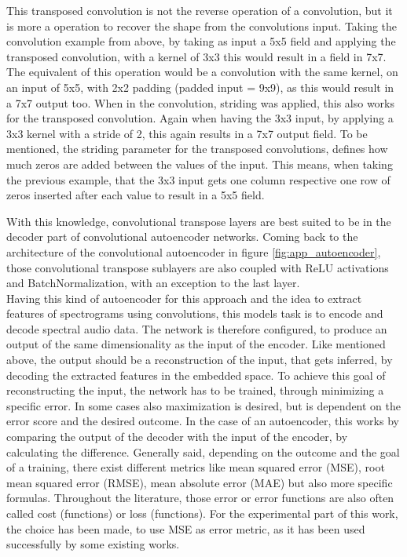 This transposed convolution is not the reverse operation of a convolution, but it is more a operation to recover the shape from the convolutions input. \cite{dumoulin2018guideconv} Taking the convolution example from above, by taking as input a 5x5 field and applying the transposed convolution, with a kernel of 3x3 this would result in a field in 7x7. The equivalent of this operation would be a convolution with the same kernel, on an input of 5x5, with 2x2 padding (padded input = 9x9), as this would result in a 7x7 output too.
When in the convolution, striding was applied, this also works for the transposed convolution. Again when having the 3x3 input, by applying a 3x3 kernel with a stride of 2, this again results in a 7x7 output field. To be mentioned, the striding parameter for the transposed convolutions, defines how much zeros are added between the values of the input. This means, when taking the previous example, that the 3x3 input gets one column respective one row of zeros inserted after each value to result in a 5x5 field.

With this knowledge, convolutional transpose layers are best suited to be in the decoder part of convolutional autoencoder networks. Coming back to the architecture of the convolutional autoencoder in figure \ref{fig:app_autoencoder}, those convolutional transpose sublayers are also coupled with ReLU activations and BatchNormalization, with an exception to the last layer.\\

Having this kind of autoencoder for this approach and the idea to extract features of spectrograms using convolutions, this models task is to encode and decode spectral audio data. The network is therefore configured, to produce an output of the same dimensionality as the input of the encoder. Like mentioned above, the output should be a reconstruction of the input, that gets inferred, by decoding the extracted features in the embedded space. To achieve this goal of reconstructing the input, the network has to be trained, through minimizing a specific error. In some cases also maximization is desired, but is dependent on the error score and the desired outcome. In the case of an autoencoder, this works by comparing the output of the decoder with the input of the encoder, by calculating the difference. Generally said, depending on the outcome and the goal of a training, there exist different metrics like mean squared error (MSE), root mean squared error (RMSE), mean absolute error (MAE) but also more specific formulas. Throughout the literature, those error or error functions are also often called cost (functions) or loss (functions). For the experimental part of this work, the choice has been made, to use MSE as error metric, as it has been used successfully by some existing works. 

